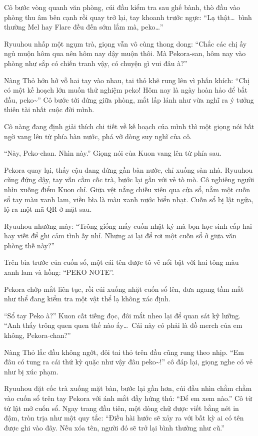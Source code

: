 \documentclass[../main.tex]{subfiles}
\begin{document}

Cô bước vòng quanh văn phòng, cúi đầu kiểm tra sau ghế bành, thò đầu vào phòng thu âm bên cạnh rồi quay trở lại, tay khoanh trước ngực: ``Lạ thật\dots\ bình thường Mel hay Flare đều đến sớm lắm mà, peko\dots''

Ryuuhou nhấp một ngụm trà, giọng vẫn vô cùng thong dong: ``Chắc các chị ấy ngủ muộn hôm qua nên hôm nay dậy muộn thôi. Mà Pekora-san, hôm nay vào phòng như sắp có chiến tranh vậy, có chuyện gì vui đâu à?''

Nàng Thỏ hớn hở vỗ hai tay vào nhau, tai thỏ khẽ rung lên vì phấn khích: ``Chị có một kế hoạch lớn muốn thử nghiệm peko! Hôm nay là ngày hoàn hảo để bắt đầu, peko\~{}'' Cô bước tới đứng giữa phòng, mắt lấp lánh như vừa nghĩ ra ý tưởng thiên tài nhất cuộc đời mình.

Cô nàng đang định giải thích chi tiết về kế hoạch của mình thì một giọng nói bất ngờ vang lên từ phía bàn nước, phá vỡ dòng suy nghĩ của cô.

``Này, Peko-chan. Nhìn này.'' Giọng nói của Kuon vang lên từ phía sau.

Pekora quay lại, thấy cậu đang đứng gần bàn nước, chỉ xuống sàn nhà. Ryuuhou cũng đứng dậy, tay vẫn cầm cốc trà, bước lại gần với vẻ tò mò. Cô nghiêng người nhìn xuống điểm Kuon chỉ. Giữa vệt nắng chiếu xiên qua cửa sổ, nằm một cuốn sổ tay màu xanh lam, viền bìa là màu xanh nước biển nhạt. Cuốn sổ bị lật ngửa, lộ ra một mã QR ở mặt sau.

Ryuuhou nhướng mày: ``Trông giống mấy cuốn nhật ký mà bọn học sinh cấp hai hay viết để ghi cảm tình ấy nhỉ. Nhưng ai lại để rơi một cuốn sổ ở giữa văn phòng thế này?''

Trên bìa trước của cuốn sổ, một cái tên được tô vẽ nổi bật với hai tông màu xanh lam và hồng: ``PEKO NOTE''.


Pekora chớp mắt liên tục, rồi cúi xuống nhặt cuốn sổ lên, đưa ngang tầm mắt như thể đang kiểm tra một vật thể lạ không xác định.

``Sổ tay Peko à?'' Kuon cất tiếng đọc, đôi mắt nheo lại để quan sát kỹ lưỡng. ``Anh thấy trông quen quen thế nào ấy\dots\ Cái này có phải là đồ merch của em không, Pekora-chan?''

Nàng Thỏ lắc đầu không ngớt, đôi tai thỏ trên đầu cũng rung theo nhịp. ``Em đâu có tung ra cái thứ kỳ quặc như vậy đâu peko\~{}!'' cô đáp lại, giọng nghe có vẻ như bị xúc phạm.

Ryuuhou đặt cốc trà xuống mặt bàn, bước lại gần hơn, cúi đầu nhìn chằm chằm vào cuốn sổ trên tay Pekora với ánh mắt đầy hứng thú: ``Để em xem nào.'' Cô từ từ lật mở cuốn sổ. Ngay trang đầu tiên, một dòng chữ được viết bằng nét in đậm, tròn trịa như một quy tắc: ``Điều hài hước sẽ xảy ra với bất kỳ ai có tên được ghi vào đây. Nếu xóa tên, người đó sẽ trở lại bình thường như cũ.''
\end{document}
